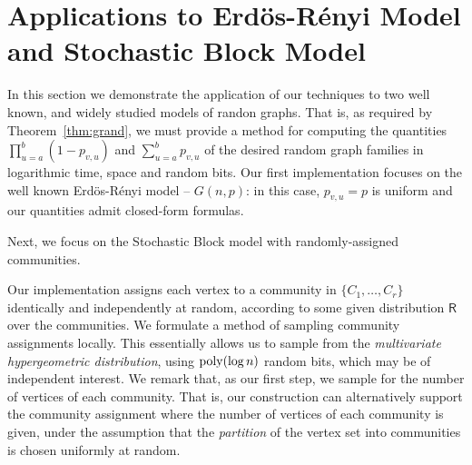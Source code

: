 \section{Applications to Erd\"{o}s-R\'{e}nyi Model and Stochastic Block Model}
\label{sec:applications}
In this section we demonstrate the application of our techniques to
two well known, and widely studied models of randon graphs. That is, as required by Theorem~\ref{thm:grand}, we must provide a method for computing the quantities $\prod_{u=a}^b (1-p_{v,u})$ and $\sum_{u=a}^b p_{v,u}$ of the desired random graph families in logarithmic time, space and random bits.
Our first implementation focuses on the well known Erd\"{o}s-R\'{e}nyi model -- $G(n,p)$: in this case, $p_{v,u} = p$ is uniform and our quantities admit closed-form formulas.

Next, we focus on the Stochastic Block model with randomly-assigned communities.
\iffalse
{\color{red}In this case, a naive solution would be to simply assign communities to contiguous blocks of indices.
In such a setting, the problem of calculating $\mathsf{F}(v,a,b)$, simply reduces to the $G(n,p)$ case,
with some additional case analysis to check when we are at a community boundary.
However, this setup is unrealistic,
and not particularly useful in the context of the Stochastic Block model.
In fact most algorithms operating on these graphs,
are trying to unveil the underlying community structure.}
{\color{blue} I'd say these motivations should show up in intro or preliminaries (for the full version)}
\fi
Our implementation assigns each vertex to a community in $\{C_1, \ldots, C_r\}$ identically and independently at random, according to some given distribution $\mathsf{R}$ over the communities. We formulate a method of sampling community assignments locally.
This essentially allows us to sample from the \emph{multivariate hypergeometric distribution},
using $\mathrm{poly}(\log n)$ random bits, which may be of independent interest. We remark that, as our first step, we sample for the number of vertices of each community. That is, our construction can alternatively support the community assignment where the number of vertices of each community is given, under the assumption that the \emph{partition} of the vertex set into communities is chosen uniformly at random.

